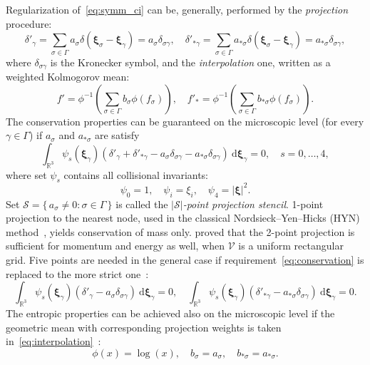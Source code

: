 \documentclass{aip-cp}
\newcommand{\dd}{\:\mathrm{d}}
\newcommand{\dxi}{\dd\boldsymbol{\xi}}
\newcommand{\bxi}{\boldsymbol{\xi}}
\newcommand{\Set}[2]{\{\,{#1}:{#2}\,\}}
\begin{document}
Regularization of~\eqref{eq:symm_ci} can be, generally, performed by the \emph{projection} procedure:
\begin{equation}\label{eq:projection}
    \delta'_\gamma = \sum_{\sigma\in\Gamma} a_\sigma \delta(\bxi_\sigma-\bxi_\gamma) = a_\sigma \delta_{\sigma\gamma}, \quad
    \delta'_{*\gamma} = \sum_{\sigma\in\Gamma} a_{*\sigma} \delta(\bxi_\sigma-\bxi_\gamma) = a_{*\sigma} \delta_{\sigma\gamma},
\end{equation}
where \(\delta_{\sigma\gamma}\) is the Kronecker symbol,
and the \emph{interpolation} one, written as a weighted Kolmogorov mean:
\begin{equation}\label{eq:interpolation}
    f' = \phi^{-1}\left( \sum_{\sigma\in\Gamma} b_\sigma \phi(f_\sigma) \right), \quad
    f'_* = \phi^{-1}\left( \sum_{\sigma\in\Gamma} b_{*\sigma} \phi(f_\sigma) \right).
\end{equation}
The conservation properties can be guaranteed on the microscopic level (for every \(\gamma\in\Gamma\))
if \(a_\sigma\) and \(a_{*\sigma}\) are satisfy
\begin{equation}\label{eq:conservation}
    \int_{\mathbb{R}^3} \psi_s(\bxi_\gamma) \left(
        \delta'_\gamma + \delta'_{*\gamma} - a_\sigma \delta_{\sigma\gamma} - a_{*\sigma} \delta_{\sigma\gamma}
    \right) \dxi_\gamma = 0, \quad s = 0,\dots,4,
\end{equation}
where set \(\psi_s\) contains all collisional invariants:
\begin{equation}\label{eq:invariants}
    \psi_0 = 1, \quad \psi_i = \xi_i, \quad \psi_4 = |\bxi|^2.
\end{equation}
Set \(\mathcal{S} = \Set{a_\sigma\neq0}{\sigma\in\Gamma}\) is called the \emph{\(|\mathcal{S}|\)-point projection stencil}.
1-point projection to the nearest node, used in the classical Nordsieck--Yen--Hicks (HYN) method~\cite{Nordsieck1966, Yen1984},
yields conservation of mass only.
\citet{Tcheremissine1998} proved that the 2-point projection is sufficient for momentum and energy as well,
when \(\mathcal{V}\) is a uniform rectangular grid.
Five points are needed in the general case if requirement~\eqref{eq:conservation} is replaced to the more strict one~\cite{Varghese2007}:
\begin{equation}\label{eq:conservation2}
    \int_{\mathbb{R}^3} \psi_s(\bxi_\gamma) \left( \delta'_\gamma - a_\sigma \delta_{\sigma\gamma} \right) \dxi_\gamma = 0, \quad
    \int_{\mathbb{R}^3} \psi_s(\bxi_\gamma) \left( \delta'_{*\gamma} - a_{*\sigma} \delta_{\sigma\gamma} \right) \dxi_\gamma = 0.
\end{equation}
The entropic properties can be achieved also on the microscopic level
if the geometric mean with corresponding projection weights is taken
in~\eqref{eq:interpolation}~\cite{Tcheremissine2006, Dodulad2013}:
\begin{equation}\label{eq:geometric_mean}
   \phi(x) = \log(x), \quad b_\sigma = a_\sigma, \quad b_{*\sigma} = a_{*\sigma}.
\end{equation}
\end{document}
